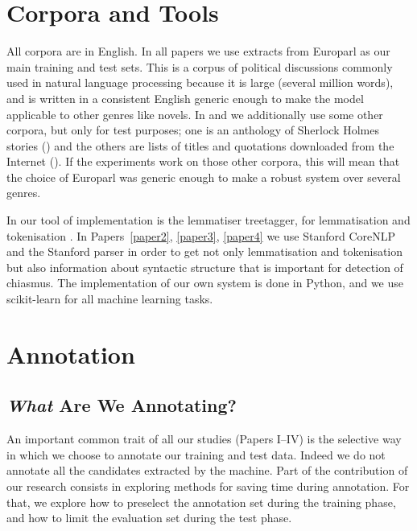 \section{Corpora and Tools}
All corpora are in English. In all papers we use extracts from Europarl \citep{koehn2005} as our main training and test sets. This is a corpus of political discussions commonly used in natural language processing because it is large (several million words), and is written in a consistent English generic enough to make the model applicable to other genres like novels. In  and  we additionally use some other corpora, but only for test purposes; one is an anthology of Sherlock Holmes stories () and the others are lists of titles and quotations downloaded from the Internet (). If the experiments work on those other corpora, this will mean that the choice of Europarl was generic enough to make a robust system over several genres.

In  our tool of implementation is the lemmatiser treetagger, for lemmatisation and tokenisation \citep{Schmid}. In Papers~\ref{paper2}, \ref{paper3}, \ref{paper4} we use Stanford CoreNLP \citep{manning2014} and the Stanford parser in order to get not only lemmatisation and tokenisation but also information about syntactic structure that is important for detection of chiasmus. The implementation of our own system is done in Python, and we use scikit-learn \citep{Pedregosa2011} for all machine learning tasks.
%

\section{Annotation}
\subsection{\textit{What} Are We Annotating?}
An important common trait of all our studies (Papers I–IV) is the selective way in which we choose to annotate our training and test data. Indeed we do not annotate all the candidates extracted by the machine. Part of the contribution of our research consists in exploring methods for saving time during annotation. For that, we explore how to preselect the annotation set during the training phase, and how to limit the evaluation set during the test phase. %
